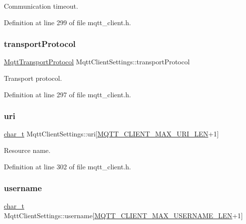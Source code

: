 Communication timeout. 



Definition at line 299 of file mqtt\+\_\+client.\+h.

\mbox{\label{structMqttClientSettings_a42da8ebd33216949919fcd6f1674adb1}} 
\subsubsection{\texorpdfstring{transport\+Protocol}{transportProtocol}}
{\footnotesize\ttfamily \hyperlink{mqtt__common_8h_ab192b1b856cff3c25110cdadf5debe0f}{Mqtt\+Transport\+Protocol} Mqtt\+Client\+Settings\+::transport\+Protocol}



Transport protocol. 



Definition at line 297 of file mqtt\+\_\+client.\+h.

\mbox{\label{structMqttClientSettings_adc38578e377b3a7cdd8bf5405ee02e52}} 
\subsubsection{\texorpdfstring{uri}{uri}}
{\footnotesize\ttfamily \hyperlink{compiler__port_8h_a40bb5262bf908c328fbcfbe5d29d0201}{char\+\_\+t} Mqtt\+Client\+Settings\+::uri\mbox{[}\hyperlink{mqtt__client_8h_afb740f6c70e916097ed4d81f7ba8097e}{M\+Q\+T\+T\+\_\+\+C\+L\+I\+E\+N\+T\+\_\+\+M\+A\+X\+\_\+\+U\+R\+I\+\_\+\+L\+EN}+1\mbox{]}}



Resource name. 



Definition at line 302 of file mqtt\+\_\+client.\+h.

\mbox{\label{structMqttClientSettings_a1bb2237c5c930fc36b8048a3cf96a3fd}} 
\subsubsection{\texorpdfstring{username}{username}}
{\footnotesize\ttfamily \hyperlink{compiler__port_8h_a40bb5262bf908c328fbcfbe5d29d0201}{char\+\_\+t} Mqtt\+Client\+Settings\+::username\mbox{[}\hyperlink{mqtt__client_8h_a7412bacef3d152d0fbb35689ac123c6f}{M\+Q\+T\+T\+\_\+\+C\+L\+I\+E\+N\+T\+\_\+\+M\+A\+X\+\_\+\+U\+S\+E\+R\+N\+A\+M\+E\+\_\+\+L\+EN}+1\mbox{]}}



